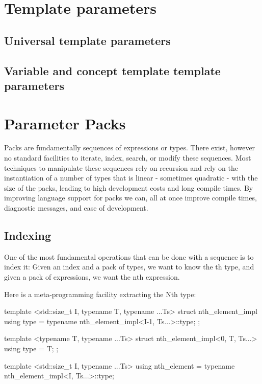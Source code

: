 \documentclass{wg21}
\begin{document}
\section{Template parameters}

\subsection{Universal template parameters}


\subsection{Variable and concept template template parameters}


\section{Parameter Packs}

Packs are fundamentally sequences of expressions or types.
There exist, however no standard facilities to iterate, index, search, or modify these sequences.
Most techniques to manipulate these sequences rely on recursion and rely on the instantiation of a number of types that is linear - sometimes quadratic - with the size of the packs, leading to high development costs and long compile times.
By improving language support for packs we can, all at once improve compile times, diagnostic messages, and ease of development.

\subsection{Indexing}

One of the most fundamental operations that can be done with a sequence is to index it:
Given an index  and a pack of types, we want to know the th type, and given a pack of expressions, we want the nth expression.

Here is a meta-programming facility extracting the Nth type:

\begin{colorblock}
template <std::size_t I, typename T, typename ...Ts>
struct nth_element_impl {
    using type = typename nth_element_impl<I-1, Ts...>::type;
};

template <typename T, typename ...Ts>
struct nth_element_impl<0, T, Ts...> {
    using type = T;
};

template <std::size_t I, typename ...Ts>
using nth_element = typename nth_element_impl<I, Ts...>::type;
\end{colorblock}
\end{document}
